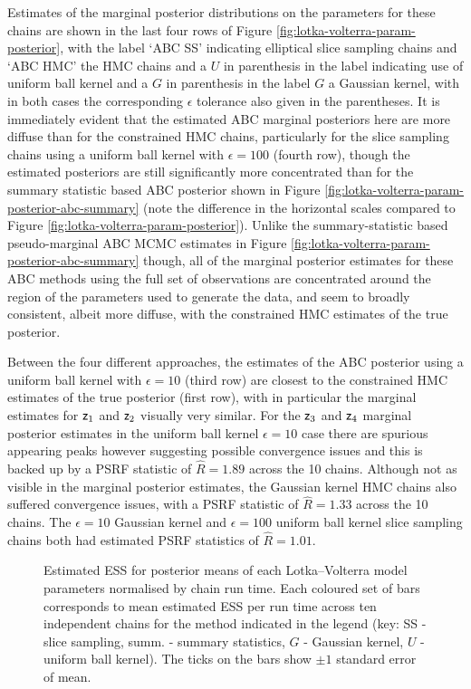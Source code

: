 Estimates of the marginal posterior distributions on the parameters for these chains are shown in the last four rows of Figure \ref{fig:lotka-volterra-param-posterior}, with the label `ABC SS' indicating elliptical slice sampling chains and `ABC HMC' the \ac{HMC} chains and a $U$ in parenthesis in the label indicating use of uniform ball kernel and a $G$ in parenthesis in the label $G$ a Gaussian kernel, with in both cases the corresponding $\epsilon$ tolerance also given in the parentheses. It is immediately evident that the estimated \ac{ABC} marginal posteriors here are more diffuse than for the constrained \ac{HMC} chains, particularly for the slice sampling chains using a uniform ball kernel with $\epsilon = 100$ (fourth row), though the estimated posteriors are still significantly more concentrated than for the summary statistic based \ac{ABC} posterior shown in Figure \ref{fig:lotka-volterra-param-posterior-abc-summary} (note the difference in the horizontal scales compared to Figure \ref{fig:lotka-volterra-param-posterior}). Unlike the summary-statistic based pseudo-marginal \ac{ABC} \ac{MCMC} estimates  in Figure \ref{fig:lotka-volterra-param-posterior-abc-summary} though, all of the marginal posterior estimates for these \ac{ABC} methods using the full set of observations are concentrated around the region of the parameters used to generate the data, and seem to broadly consistent, albeit more diffuse, with the constrained \ac{HMC} estimates of the true posterior.

Between the four different approaches, the estimates of the \ac{ABC} posterior using a uniform ball kernel with $\epsilon = 10$ (third row) are closest to the constrained \ac{HMC} estimates of the true posterior (first row), with in particular the marginal estimates for $\mathsf{z}_1$ and $\mathsf{z}_2$ visually very similar. For the $\mathsf{z}_3$ and $\mathsf{z}_4$ marginal posterior estimates in the uniform ball kernel $\epsilon = 10$ case there are spurious appearing peaks however suggesting possible convergence issues and this is backed up by a \ac{PSRF} statistic of $\hat{R} = 1.89$ across the 10 chains. Although not as visible in the marginal posterior estimates, the Gaussian kernel \ac{HMC} chains also suffered convergence issues, with a \ac{PSRF} statistic of $\hat{R} = 1.33$ across the 10 chains. The $\epsilon=10$ Gaussian kernel and $\epsilon=100$ uniform ball kernel slice sampling chains both had estimated \ac{PSRF} statistics of $\hat{R} = 1.01$.

\begin{figure}
\centering
{}
\caption[Lotka--Volterra model \acs{ESS} estimates.]{Estimated \ac{ESS} for posterior means of each Lotka--Volterra model parameters normalised by chain run time. Each coloured set of bars corresponds to mean estimated \ac{ESS} per run time across ten independent chains for the method indicated in the legend (key: SS - slice sampling, summ. - summary statistics, $G$ - Gaussian kernel, $U$ - uniform ball kernel). The ticks on the bars show $\pm 1$ standard error of mean.}
\label{fig:lotka-volterra-param-posterior-ess-plot}
\end{figure}

